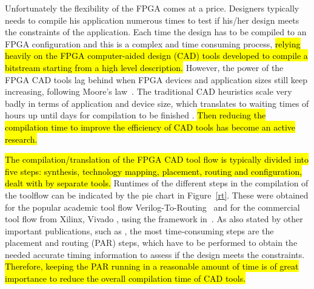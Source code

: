 \documentclass[a4paper,oneside,12pt]{article}
\begin{document}
Unfortunately the flexibility of the FPGA comes at a price. Designers typically needs to compile his application numerous times to test if his/her design meets the constraints of the application. Each time the design has to be compiled to an FPGA configuration and this is a complex and time consuming process, \hl{relying heavily on the FPGA computer-aided design (CAD) tools developed to compile a bitstream starting from a high level description.}
However, the power of the FPGA CAD tools lag behind when FPGA devices and application sizes still keep increasing, following Moore's law~\cite{shannon2015technology}. The traditional CAD heuristics scale very badly in terms of application and device size, which translates to waiting times of hours up until days for compilation to be finished \cite{murray2015timing}.
\hl{Then reducing the compilation time to improve the efficiency of CAD tools has become an active research.}

\hl{The compilation/translation of the FPGA CAD tool flow is typically divided into five steps: synthesis, technology mapping, placement, routing and configuration, dealt with by separate tools. } %
Runtimes of the different steps in the compilation of the toolflow can be indicated by the pie chart in Figure~\ref{rt}. These were obtained for the popular academic tool flow Verilog-To-Routing~\cite{luu2014vtr} and for the commercial tool flow from Xilinx, Vivado \cite{feist2012vivado}, using the framework in~\cite{vansteenkiste2015analyzing}. As also stated by other important publications, such as \cite{murray2015timing}, the most time-consuming steps are the placement and routing (PAR) steps, which have to be performed to obtain the needed accurate timing information to assess if the design meets the constraints.
\hl{Therefore, keeping the PAR running in a reasonable amount of time is of great importance to reduce the overall compilation time of CAD tools.}

\end{document}
